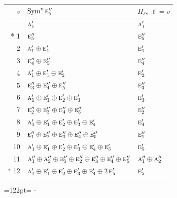 \documentclass[10pt,a4paper]{article}
\newcommand{\needspace}[1]{\par\penalty-100\begingroup\dimen0=#1\relax\dimen2=\pagegoal
  \advance\dimen2-\pagetotal\ifdim\dimen0>\dimen2\relax\ifdim\dimen2>0pt\vfil\break\fi\fi
  \endgroup}
\numberwithin{equation}{section}
\newcommand{\irr}[1]{\text{\normalfont\scshape #1}}
\begin{document}
{\small\begin{longtable}{@{}rll@{}}\toprule
$v$ & $\operatorname{Sym}^{v}\irr{e}_{5}''$ & $H_\ell$, $\ell = v$\\\midrule\endhead
\bottomrule\endfoot\endlastfoot
0 & $\irr{a}_{1}'$ & $\irr{a}_{1}'$\\*
1 & $\irr{e}_{5}''$ & $\irr{e}_{5}''$\\
2 & $\irr{a}_{1}' \oplus \irr{e}_{1}'$ & $\irr{e}_{1}'$\\
3 & $\irr{e}_{4}'' \oplus \irr{e}_{5}''$ & $\irr{e}_{4}''$\\
4 & $\irr{a}_{1}' \oplus \irr{e}_{1}' \oplus \irr{e}_{2}'$ & $\irr{e}_{2}'$\\
5 & $\irr{e}_{3}'' \oplus \irr{e}_{4}'' \oplus \irr{e}_{5}''$ & $\irr{e}_{3}''$\\
6 & $\irr{a}_{1}' \oplus \irr{e}_{1}' \oplus \irr{e}_{2}' \oplus \irr{e}_{3}'$ & $\irr{e}_{3}'$\\
7 & $\irr{e}_{2}'' \oplus \irr{e}_{3}'' \oplus \irr{e}_{4}'' \oplus \irr{e}_{5}''$ & $\irr{e}_{2}''$\\
8 & $\irr{a}_{1}' \oplus \irr{e}_{1}' \oplus \irr{e}_{2}' \oplus \irr{e}_{3}' \oplus \irr{e}_{4}'$ & $\irr{e}_{4}'$\\
9 & $\irr{e}_{1}'' \oplus \irr{e}_{2}'' \oplus \irr{e}_{3}'' \oplus \irr{e}_{4}'' \oplus \irr{e}_{5}''$ & $\irr{e}_{1}''$\\
10 & $\irr{a}_{1}' \oplus \irr{e}_{1}' \oplus \irr{e}_{2}' \oplus \irr{e}_{3}' \oplus \irr{e}_{4}' \oplus \irr{e}_{5}'$ & $\irr{e}_{5}'$\\
11 & $\irr{a}_{1}'' \oplus \irr{a}_{2}'' \oplus \irr{e}_{1}'' \oplus \irr{e}_{2}'' \oplus \irr{e}_{3}'' \oplus \irr{e}_{4}'' \oplus \irr{e}_{5}''$ & $\irr{a}_{1}'' \oplus \irr{a}_{2}''$\\*
12 & $\irr{a}_{1}' \oplus \irr{e}_{1}' \oplus \irr{e}_{2}' \oplus \irr{e}_{3}' \oplus \irr{e}_{4}' \oplus 2\,\irr{e}_{5}'$ & $\irr{e}_{5}'$\\
\bottomrule\end{longtable}}
\needspace{122pt}
\end{document}
